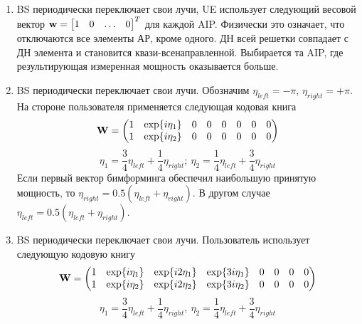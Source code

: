 \begin{enumerate}[label=\textbf{Шаг \arabic*:}]
    \item BS периодически переключает свои лучи, UE использует следующий весовой вектор $\vec w = \mqty*[1 & 0 & \dots & 0]^T$ для каждой AIP.
          Физически это означает, что отключаются все элементы АР, кроме одного. ДН всей решетки совпадает с ДН элемента и становится квази-всенаправленной.
          Выбирается та AIP, где результирующая измеренная мощность оказывается больше.
    \item BS периодически переключает свои лучи. Обозначим $\eta_{left} = - \pi$, $\eta_{right} = + \pi$.
          На стороне пользователя применяется следующая кодовая книга
          \begin{equation}
               \label{eq:4.51}
              \vec W =
              \begin{pmatrix}
                  \mqty{ 1 & \exp{i\eta_1}} & \zmat{1}{6} \\
                  \mqty{ 1 & \exp{i\eta_2}} & \zmat{1}{6} \\
              \end{pmatrix}
          \end{equation}
          \begin{equation}
              \eta_1 = \frac34 \eta_{left} + \frac14 \eta_{right}; ~ \eta_2 = \frac14 \eta_{left} + \frac34 \eta_{right}
          \end{equation}
          Если первый вектор бимформинга обеспечил наибольшую принятую мощность, то
          $\eta_{right} = 0.5 (\eta_{left} + \eta_{right})$.
          В другом случае
          $\eta_{left} = 0.5 (\eta_{left} + \eta_{right})$.
          
    \item BS периодически переключает свои лучи. Пользователь использует следующую кодовую книгу
          \begin{equation}
            \label{eq:4.53}
              \vec W =
              \begin{pmatrix}
                  \mqty{ 1 & \exp{i\eta_1} & \exp{i2\eta_1} & \exp{3i\eta_1}} & \zmat{1}{4} \\
                  \mqty{ 1 & \exp{i\eta_2} & \exp{i2\eta_2} & \exp{3i\eta_2}} & \zmat{1}{4} \\
              \end{pmatrix}
          \end{equation}
          \begin{equation}
              \eta_1 = \frac34 \eta_{left} + \frac14 \eta_{right}, ~ \eta_2 = \frac14 \eta_{left} + \frac34 \eta_{right}
          \end{equation}
          

\end{enumerate}
